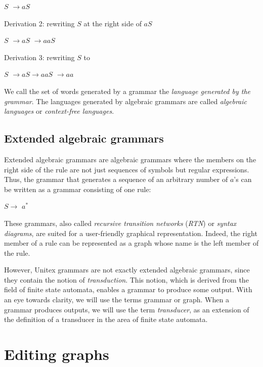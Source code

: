 \underline{$S$} $\rightarrow aS$

\bigskip Derivation 2: rewriting $S$ at the right side of $aS$

$S$ $\rightarrow a$\underline{$S$} $\rightarrow aaS$

\bigskip Derivation 3: rewriting $S$ to \E

$S$ $\rightarrow aS \rightarrow aa$\underline{$S$} $\rightarrow aa$

\bigskip
\noindent We call the set of words generated by a grammar the \textit{language
generated by the grammar}. The languages generated by algebraic grammars are
called \textit{algebraic languages} or
\textit{context-free languages}.


\subsection{Extended algebraic grammars}

Extended algebraic grammars are algebraic grammars where the members on the right
side of the rule are not just sequences of symbols but regular
expressions. Thus, the grammar that generates a
sequence of an arbitrary number of $a$'s can be written as a grammar consisting
of one rule:

\bigskip $S \rightarrow$ $a^{*}$

\bigskip
\noindent These grammars, also called \textit{recursive transition networks}
(\textit{RTN}) or \textit{syntax
diagrams}, are suited for a user-friendly graphical
representation. Indeed, the right member of a rule can be represented as a graph
whose name is the left member of the rule.

\bigskip
\noindent However, Unitex grammars are not exactly extended algebraic grammars, since they
contain the notion of \textit{transduction}. This notion,
which is derived from the field of finite state automata, enables a grammar to
produce some output. With an eye towards clarity, we will use the terms grammar
or graph. When a grammar produces outputs, we will use the term
\textit{transducer}, as an extension of the definition of a
transducer in the area of finite state automata.


\section{Editing graphs}
\label{section-editing-graphs}
